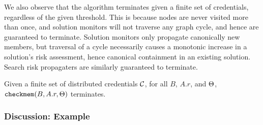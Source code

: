 We also observe that the algorithm terminates given a finite set of
credentials, regardless of the given threshold.  This is because nodes
are never visited more than once, and solution monitors will not
traverse any graph cycle, and hence are guaranteed to terminate.
Solution monitors only propagate canonically new members, but
traversal of a cycle necessarily causes a monotonic increase in a
solution's risk assessment, hence canonical containment in an existing
solution.  Search risk propagaters are similarly guaranteed to
terminate.
\begin{theorem}[Termination]
Given a finite set of distributed credentials $\mathcal{C}$, for all $B$, $A.r$,
and $\Theta$, $\texttt{checkmem}(B,A.r,\Theta)$ terminates.
\end{theorem}

\subsubsection{Discussion: Example} 
\label{section-discovery-example}

\discoveryexamplefig

